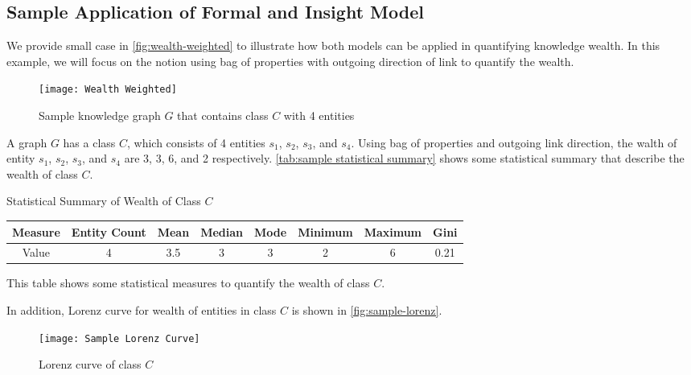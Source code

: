 \subsection{Sample Application of Formal and Insight Model}

We provide small case in \autoref{fig:wealth-weighted} to illustrate how both models can be applied in quantifying knowledge wealth. In this example, we will focus on the notion using bag of properties with outgoing direction of link to quantify the wealth.

\begin{figure}[!h]
    \centering
    \texttt{[image: Wealth Weighted]}
    \caption{Sample knowledge graph \(G\) that contains class \(C\) with 4 entities} \label{fig:wealth-weighted}
\end{figure}

A graph \(G\) has a class \(C\), which consists of 4 entities \(s_1\), \(s_2\), \(s_3\), and \(s_4\). Using bag of properties and outgoing link direction, the walth of entity \(s_1\), \(s_2\), \(s_3\), and \(s_4\) are 3, 3, 6, and 2 respectively. \autoref{tab:sample statistical summary} shows some statistical summary that describe the wealth of class \(C\).

\begin{center}
    \small
    \begin{threeparttable}
    \caption{Statistical Summary of Wealth of Class \(C\)}
    \label{tab:sample statistical summary}
    \begin{tabular}{c | c c c c c c c} 
    
    \toprule
        Measure & Entity Count & Mean & Median & Mode & Minimum & Maximum & Gini \\ [0.5ex] 
    \midrule
        Value & 4 & 3.5 & 3 & 3 & 2 & 6 & 0.21 \\
        [0.5ex]
    \bottomrule
    \end{tabular}
    \begin{tablenotes}
        \footnotesize
        \item{This table shows some statistical measures to quantify the wealth of class \(C\).}
    \end{tablenotes}
    \end{threeparttable}
\end{center}

In addition, Lorenz curve for wealth of entities in class \(C\) is shown in \autoref{fig:sample-lorenz}.

\begin{figure}[!h]
    \centering
    \texttt{[image: Sample Lorenz Curve]}
    \caption{Lorenz curve of class \(C\)} \label{fig:sample-lorenz}
\end{figure}
